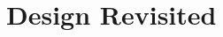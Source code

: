 \begin{comment}
http://docs.oracle.com/javaee/6/api/javax/persistence/UniqueConstraint.html

BEAN supported
https://jcp.org/en/jsr/detail?id=303

supports udf validations
http://book.cakephp.org/2.0/en/models/data-validation.html

basically you set up your own schema, but default validations don't
appear to be transactional




https://github.com/cakephp/cakephp/blob/50b3893e6507979427e1aaeb435494aed1af4f52/lib/Cake/Model/Model.php#L3303



Manually define database schema!


http://laravel.com/docs/4.2/validation#rule-unique
https://github.com/laravel/framework/blob/75b1dff27778354e44511556171cf6ae466c8b59/src/Illuminate/Validation/Validator.php#L940


http://laravelbook.com/laravel-input-validation/


Validations are handled by Anchor, a thin layer on top of Validator, one of the most robust validation libraries for Node.js. Sails supports most of the validations available in Validator, as well as a few extras that require database integration, like unique.

http://sailsjs.org/#/documentation/concepts/ORM/Validations.html
https://github.com/balderdashy/sails/issues/832

https://github.com/balderdashy/waterline

Broken in Mongo
https://github.com/balderdashy/sails-mongo/issues/152

Broken in dev
https://github.com/balderdashy/waterline/issues/55

Because you have migrate: safe set the indexes will not be created when you start the ORM.
https://github.com/balderdashy/waterline/issues/236

uses db foreign keys

\end{comment}




\section{Design Revisited}
\label{sec:discussion}

